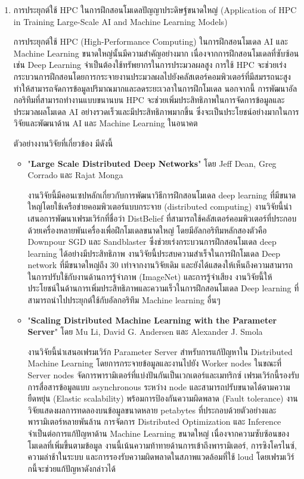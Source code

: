 \documentclass[a4paper,12pt]{extarticle}
\begin{document}
\begin{enumerate}
	\item การประยุกต์ใช้ HPC ในการฝึกสอนโมเดลปัญญาประดิษฐ์ขนาดใหญ่ (Application of HPC in Training Large-Scale AI and Machine Learning Models) %

	การประยุกต์ใช้ HPC (High-Performance Computing) ในการฝึกสอนโมเดล AI และ Machine Learning ขนาดใหญ่นั้นมีความสำคัญอย่างมาก เนื่องจากการฝึกสอนโมเดลที่ซับซ้อน เช่น Deep Learning จำเป็นต้องใช้ทรัพยากรในการประมวลผลสูง การใช้ HPC จะช่วยเร่งกระบวนการฝึกสอนโดยการกระจายงานประมวลผลไปยังคลัสเตอร์คอมพิวเตอร์ที่มีสมรรถนะสูง ทำให้สามารถจัดการข้อมูลปริมาณมากและลดระยะเวลาในการฝึกโมเดล นอกจากนี้ การพัฒนาอัลกอริทึมที่สามารถทำงานแบบขนานบน HPC จะช่วยเพิ่มประสิทธิภาพในการจัดการข้อมูลและประมวลผลโมเดล AI อย่างรวดเร็วและมีประสิทธิภาพมากขึ้น ซึ่งจะเป็นประโยชน์อย่างมากในการวิจัยและพัฒนาด้าน AI และ Machine Learning ในอนาคต

	ตัวอย่างงานวิจัยที่เกี่ยวข้อง มีดังนี้
	\begin{itemize}
		\item "\textbf{Large Scale Distributed Deep Networks}" โดย Jeff Dean, Greg Corrado และ Rajat Monga

		งานวิจัยนี้มีคอนเซปหลักเกี่ยวกับการพัฒนาวิธีการฝึกสอนโมเดล deep learning ที่มีขนาดใหญ่โดยใช้เครือข่ายคอมพิวเตอร์แบบกระจาย (distributed computing) งานวิจัยนี้นำเสนอการพัฒนาเฟรมเวิร์กที่ชื่อว่า DistBelief ที่สามารถใช้คลัสเตอร์คอมพิวเตอร์ที่ประกอบด้วยเครื่องหลายพันเครื่องเพื่อฝึกโมเดลขนาดใหญ่ โดยมีอัลกอริทึมหลักสองตัวคือ Downpour SGD และ Sandblaster ซึ่งช่วยเร่งกระบวนการฝึกสอนโมเดล deep learning ได้อย่างมีประสิทธิภาพ งานวิจัยนี้ประสบความสำเร็จในการฝึกโมเดล Deep network ที่มีขนาดใหญ่ถึง 30 เท่าจากงานวิจัยเดิม และยังได้แสดงให้เห็นถึงความสามารถในการปรับใช้กับงานด้านการรู้จำภาพ (ImageNet) และการรู้จำเสียง งานวิจัยนี้ให้ประโยชน์ในด้านการเพิ่มประสิทธิภาพและความเร็วในการฝึกสอนโมเดล Deep learning ที่สามารถนำไปประยุกต์ใช้กับอัลกอริทึม Machine learning อื่นๆ

		\item "\textbf{Scaling Distributed Machine Learning with the Parameter Server}" โดย Mu Li, David G. Andersen และ Alexander J. Smola

		งานวิจัยนี้นำเสนอเฟรมเวิร์ก Parameter Server สำหรับการแก้ปัญหาใน Distributed Machine Learning โดยการกระจายข้อมูลและงานไปยัง Worker nodes ในขณะที่ Server nodes จัดการพารามิเตอร์ที่แบ่งปันกันเป็นเวกเตอร์และเมทริกซ์ เฟรมเวิร์กนี้รองรับการสื่อสารข้อมูลแบบ asynchronous ระหว่าง node และสามารถปรับขนาดได้ตามความยืดหยุ่น (Elastic scalability) พร้อมการป้องกันความผิดพลาด (Fault tolerance) งานวิจัยแสดงผลการทดลองบนข้อมูลขนาดหลาย petabytes ที่ประกอบด้วยตัวอย่างและพารามิเตอร์หลายพันล้าน การจัดการ Distributed Optimization และ Inference จำเป็นต่อการแก้ปัญหาด้าน Machine Learning ขนาดใหญ่ เนื่องจากความซับซ้อนของโมเดลที่เพิ่มขึ้นตามข้อมูล งานนี้เน้นความท้าทายด้านการเข้าถึงพารามิเตอร์, การซิงโครไนซ์, ความล่าช้าในระบบ และการรองรับความผิดพลาดในสภาพแวดล้อมที่ใช้ loud โดยเฟรมเวิร์กนี้จะช่วยแก้ปัญหาดังกล่าวได้
	\end{itemize}


\end{enumerate}
\end{document}

